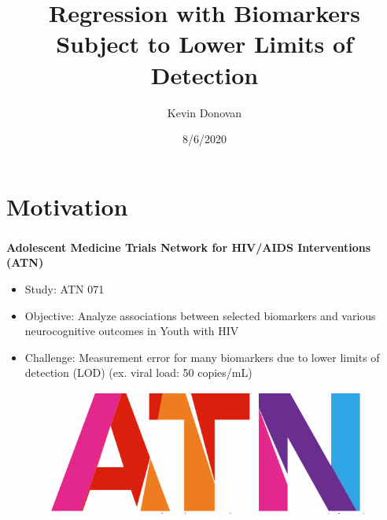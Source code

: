 \documentclass[xcolor=dvipsnames]{beamer}
\title[lodr]{Regression with Biomarkers Subject to Lower Limits of Detection}
\author[Donovan, Hudgens, Psioda, and Loop]{Kevin Donovan}
\institute[UNC]{University of North Carolina at Chapel Hill}
\date[8/6/2020]{8/6/2020}
\begin{document}
\begin{frame}
	\titlepage
	\begin{figure}
	\end{figure}
\end{frame}


\section{Motivation}
\begin{frame}
\frametitle{\insertsectionhead}
\textbf{Adolescent Medicine Trials Network for HIV/AIDS Interventions (ATN) }
\begin{itemize}
\item Study: ATN 071
\item Objective: Analyze associations between selected biomarkers and various neurocognitive outcomes in Youth with HIV
\item Challenge: Measurement error for many biomarkers due to lower limits of detection (LOD) (ex. viral load: 50 copies/mL)
\end{itemize}
\begin{figure}
	\begin{center}
		\includegraphics[scale = 0.2]{atn_logo.png}
	\end{center}
\end{figure}

\end{frame}
\end{document}
